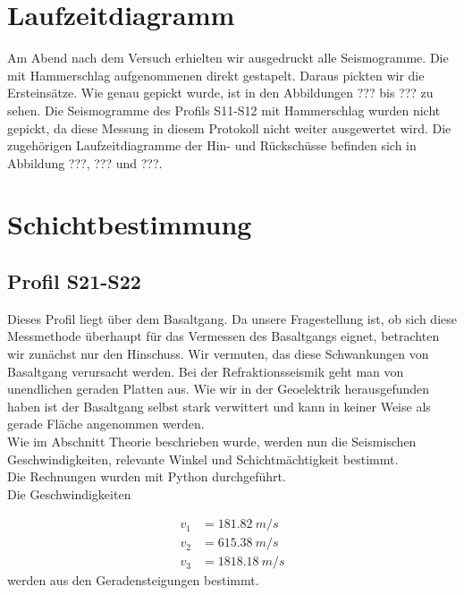 \section{Laufzeitdiagramm}

Am Abend nach dem Versuch erhielten wir ausgedruckt alle Seismogramme. Die mit Hammerschlag aufgenommenen direkt gestapelt. Daraus pickten wir die Ersteinsätze. Wie genau gepickt wurde, ist in den Abbildungen ??? bis ??? zu sehen. Die Seismogramme des Profils S11-S12 mit Hammerschlag wurden nicht gepickt, da diese Messung in diesem Protokoll nicht weiter ausgewertet wird. Die zugehörigen Laufzeitdiagramme der Hin- und Rückschüsse befinden sich in Abbildung ???, ??? und ???.

\section{Schichtbestimmung}



\subsection{Profil S21-S22 }

Dieses Profil liegt über dem Basaltgang. Da unsere Fragestellung ist, ob sich diese Messmethode überhaupt für das Vermessen des Basaltgangs eignet, betrachten wir zunächst nur den Hinschuss. 
Wir vermuten, das diese Schwankungen von Basaltgang verursacht werden. Bei der Refraktionsseismik geht man von unendlichen geraden Platten aus. Wie wir in der Geoelektrik herausgefunden haben ist der Basaltgang selbst stark verwittert und kann in keiner Weise als gerade Fläche angenommen werden.\\


Wie im Abschnitt Theorie beschrieben wurde, werden nun die Seismischen Geschwindigkeiten, relevante Winkel und Schichtmächtigkeit bestimmt.\\
Die Rechnungen wurden mit Python durchgeführt.\\

Die Geschwindigkeiten 

\begin{align}
 v_1 &= \SI{181.82}{m/s} \\
 v_2 &= \SI{615.38}{m/s} \\
 v_3 &= \SI{1818.18}{m/s}
\end{align}
werden aus den Geradensteigungen bestimmt.

